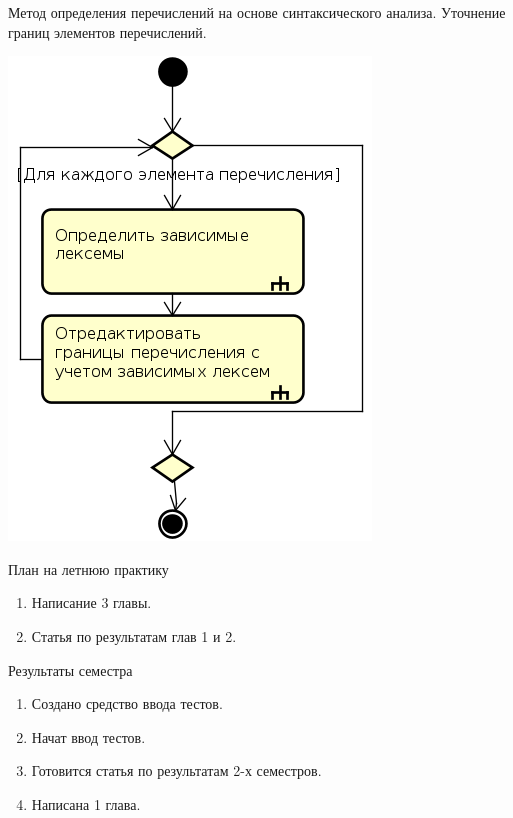 \documentclass[10pt,ps,serif,mathserif]{beamer}
\begin{document}
    \begin{frame}{Метод определения перечислений на основе синтаксического анализа. Уточнение границ элементов перечислений.}
        \begin{center}
            \includegraphics[height=0.7\textheight]{images/algorithm2.png}
        \end{center}
    \end{frame}
    \begin{frame}{План на летнюю практику}
        \Large
        \begin{enumerate}
            \item Написание 3 главы.
            \item Статья по результатам глав 1 и 2.
        \end{enumerate}
    \end{frame}
    \begin{frame}{Результаты семестра}
        \Large
        \begin{enumerate}
            \item Создано средство ввода тестов.
            \item Начат ввод тестов.
            \item Готовится статья по результатам 2-х семестров.
            \item Написана 1 глава.
        \end{enumerate}
    \end{frame}
\end{document}
